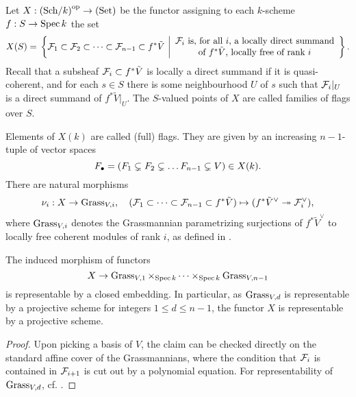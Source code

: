 \documentclass[../main.tex]{subfiles}
\begin{document}
\begin{defi}\label{def:FlagVariety}
  Let $X: {(\mathrm{Sch}/{k})}^{\mathrm{op}} \to {(\mathrm{Set})}$ be the functor assigning to each $k$-scheme 
  $f:S \to \operatorname{Spec} k$
  the set 
  \begin{equation*}
    X(S) = \\ \left\{\cF_1 \subset \cF_2 \subset \dots \subset \cF_{n-1} \subset
      f^* \tilde V \ \bigg \vert  \begin{array}c
      \text{$\cF_i$ is, for all $i$, a locally direct summand} \\
      \text{of $f^*\tilde V$, locally free of rank $i$}
  \end{array} \right\}.
  \end{equation*}
  Recall that a subsheaf $\mathcal{F}_i \subset f^* \tilde V$ is
  locally a direct summand
  if it is quasi-coherent, and for each $s \in S$ there is some neighbourhood 
  $U$ of $s$ such that $\mathcal{F}_i|_U$ is a direct summand of $f^* \tilde V|_U$. 
  The $S$-valued points of $X$ are called families of flags over $S$.
\end{defi}
Elements of $X(k)$ are called (full) flags. They are given by an increasing
$n-1$-tuple of vector spaces 
$$F_\bullet = (F_1 \subsetneq F_2 \subsetneq \dots F_{n-1} \subsetneq V) \in X(k).$$
  There are natural morphisms
  \begin{equation*}
    \nu_i: X \to \operatorname{Grass}_{V,i}, \quad (\mathcal{F}_1 \subset \dots \subset \mathcal{F}_{n-1}
    \subset f^* \tilde V) \mapsto (f^* \tilde V^\vee \twoheadrightarrow \mathcal{F}_i^\vee),
  \end{equation*}
  where $\operatorname{Grass}_{V,i}$ denotes the Grassmannian parametrizing surjections of
  $f^*\tilde V^\vee$ to locally free coherent modules of rank $i$, as defined
  in \cite{Ricolfi2022}.

\begin{prop}\label{prop:FlagVarisProjective}
  The induced morphism of functors
  \begin{equation*}
    X \to \operatorname{Grass}_{V,1} \times_{\operatorname{Spec} k} \dots \times_{\operatorname{Spec} k}
    \operatorname{Grass}_{V,n-1}
  \end{equation*}
  is representable by a closed embedding. In particular, as $\operatorname{Grass}_{V,d}$ is
  representable by a projective scheme for integers $1 \leq d \leq n-1$, 
  the functor $X$ is representable by a projective scheme. 
\begin{proof}
  Upon picking a basis of $V$, the claim can be checked directly on the
  standard affine cover of the Grassmannians, where the condition that $\mathcal{F}_i$ is
  contained in $\mathcal{F}_{i+1}$ is cut out by a polynomial equation.
  For representability of $\operatorname{Grass}_{V,d}$, cf. \cite[Theorem 5.1.4]{Ricolfi2022}.
\end{proof}
\end{prop}
\end{document}
